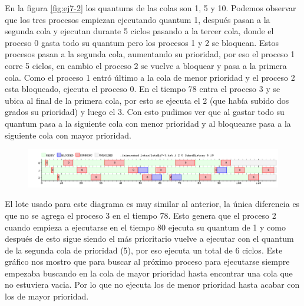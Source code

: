 En la figura \ref{fig:ej7-2} los quantums de las colas son 1, 5 y 10. Podemos observar que los tres procesos empiezan ejecutando quantum 1, después pasan a la segunda cola y ejecutan durante 5 ciclos pasando a la tercer cola, donde el proceso 0 gasta todo su quantum pero los procesos 1 y 2 se bloquean. Estos procesos pasan a la segunda cola, aumentando su prioridad, por eso el proceso 1 corre 5 ciclos, en cambio el proceso 2 se vuelve a bloquear y pasa a la primera cola. Como el proceso 1 entró último a la cola de menor prioridad y el proceso 2 esta bloqueado, ejecuta el proceso 0. En el tiempo 78 entra el proceso 3 y se ubica al final de la primera cola, por esto se ejecuta el 2 (que había subido dos grados su prioridad) y luego el 3. Con esto pudimos ver que al gastar todo su quantum pasa a la siguiente cola con menor prioridad y al bloquearse pasa a la siguiente cola con mayor prioridad.

\begin{figure}[H]
  \centering
  \includegraphics[width=1\textwidth]{img/imgEj7-3}
  \caption{}
  \label{fig:ej7-3}
\end{figure}

El lote usado para este diagrama es muy similar al anterior, la única diferencia es que no se agrega el proceso 3 en el tiempo 78. Esto genera que el proceso 2 cuando empieza a ejecutarse en el tiempo 80 ejecuta su quantum de 1 y como después de esto sigue siendo el más prioritario vuelve a ejecutar con el quantum de la segunda cola de prioridad (5), por eso ejecuta un total de 6 ciclos. Este gráfico nos mostro que para buscar al próximo proceso para ejecutarse siempre empezaba buscando en la cola de mayor prioridad hasta encontrar una cola que no estuviera vacia. Por lo que no ejecuta los de menor prioridad hasta acabar con los de mayor prioridad.

